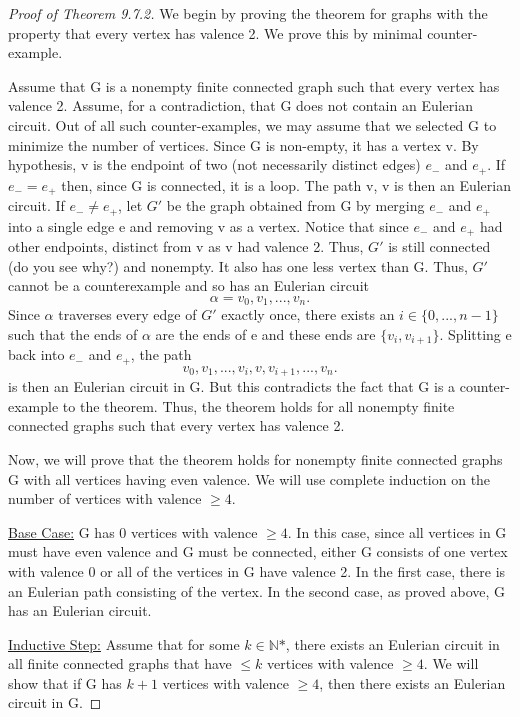     \begin{proof}[Proof of Theorem 9.7.2]

    We begin by proving the theorem for graphs with the property that every
    vertex has valence 2. We prove this by minimal counter-example.


    Assume that G is a nonempty finite connected graph such that every vertex has valence 2. Assume,
    for a contradiction, that G does not contain an Eulerian circuit. Out of all such counter-examples, we
    may assume that we selected G to minimize the number of vertices. Since G is non-empty, it has a
    vertex v. By hypothesis, v is the endpoint of two (not necessarily distinct edges) $e_-$ and $e_+$. If $e_- = e_+$
    then, since G is connected, it is a loop. The path v, v is then an Eulerian circuit. If $e_- \neq e_+$, let $G'$ be the graph obtained from G by merging $e_-$ and $e_+$ into a single edge e and removing v as a vertex. Notice that since $e_-$ and $e_+$ had other endpoints, distinct from v as v had valence 2. Thus, $G'$ is still connected (do you see why?) and nonempty. It also has one less vertex than G. Thus, $G'$ cannot be a counterexample and so has an Eulerian circuit
    \[
    \alpha = v_0, v_1,..., v_n.
    \]
    Since $\alpha$ traverses every edge of $G'$ exactly once, there exists an $i \in \{0,...,n -1\}$ such that the ends of $\alpha$
    are the ends of e and these ends are $\{v_i , v_{i+1}\}$. Splitting e back into $e_-$ and $e_+$, the path
    \[
    v_0, v_1,..., v_i , v, v_{i+1},..., v_n.
    \]
    is then an Eulerian circuit in G. But this contradicts the fact that G is a counter-example to the theorem. Thus, the theorem holds for all nonempty finite connected graphs such that every vertex has valence 2.

    Now, we will prove that the theorem holds for nonempty finite connected graphs G with all vertices having even valence. We will use complete induction on the number of vertices with valence $\geq 4$.

    \underline{Base Case:} G has 0 vertices with valence $\geq 4$. In this case, since all vertices in G must have even valence and G must be connected, either G consists of one vertex with valence 0 or all of the vertices in G have valence 2. In the first case, there is an Eulerian path consisting of the vertex. In the second case, as proved above, G has an Eulerian circuit.

    \underline{Inductive Step:} Assume that for some $k \in \mathbb N \text{*}$, there exists an Eulerian circuit in all finite connected graphs that have $\leq k$ vertices with valence $\geq 4$. We will show that if G has $k+1$ vertices with valence $\geq 4$, then there exists an Eulerian circuit in G. 


\end{proof}
